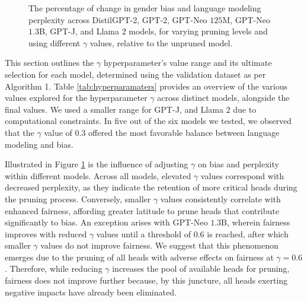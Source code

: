 \documentclass[letterpaper]{article} %
\begin{document}
\begin{figure}[t]
        \caption{The percentage of change in gender bias and language modeling perplexity across DistilGPT-2, GPT-2, GPT-Neo $125$M, GPT-Neo $1.3$B, GPT-J, and Llama $2$ models, for varying pruning levels and using different $\gamma$ values, relative to the unpruned model.}
        \label{fig:gender_bias_pruning_gamma}
\end{figure}

This section outlines the $\gamma$ hyperparameter's value range and its ultimate selection for each model, determined using the validation dataset as per Algorithm 1. Table \ref{tab:hyperparamaters} provides an overview of the various values explored for the hyperparameter $\gamma$ across distinct models, alongside the final values. We used a smaller range for GPT-J, and Llama $2$ due to computational constraints. In five out of the six models we tested, we observed that the $\gamma$ value of $0.3$ offered the most favorable balance between language modeling and bias.

Illustrated in Figure \ref{fig:gender_bias_pruning_gamma}  is the influence of adjusting $\gamma$ on bias and perplexity within different models. Across all models, elevated $\gamma$ values correspond with decreased perplexity, as they indicate the retention of more critical heads during the pruning process. Conversely, smaller $\gamma$ values consistently correlate with enhanced fairness, affording greater latitude to prune heads that contribute significantly to bias. An exception arises with GPT-Neo $1.3$B, wherein fairness improves with reduced $\gamma$ values until a threshold of 0.6 is reached, after which smaller $\gamma$ values do not improve fairness. We suggest that this phenomenon emerges due to the pruning of all heads with adverse effects on fairness at $\gamma=0.6$. Therefore, while reducing $\gamma$ increases the pool of available heads for pruning, fairness does not improve further because, by this juncture, all heads exerting negative impacts have already been eliminated.
\end{document}
